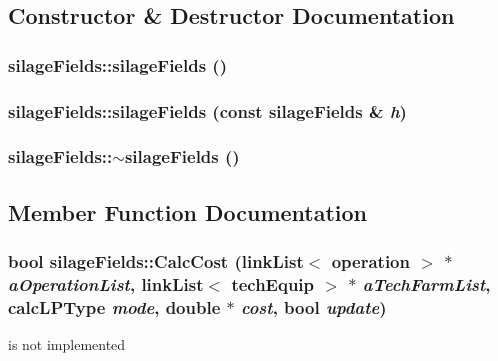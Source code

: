 \subsection{Constructor \& Destructor Documentation}
\hypertarget{classsilage_fields_ab882102171c0ffffc6a96677c726f906}{
\subsubsection[{silageFields}]{\setlength{\rightskip}{0pt plus 5cm}silageFields::silageFields ()}}
\label{classsilage_fields_ab882102171c0ffffc6a96677c726f906}
\hypertarget{classsilage_fields_a20ef91f1391296a1bd9440e13c7b3c94}{
\subsubsection[{silageFields}]{\setlength{\rightskip}{0pt plus 5cm}silageFields::silageFields (const {\bf silageFields} \& {\em h})}}
\label{classsilage_fields_a20ef91f1391296a1bd9440e13c7b3c94}
\hypertarget{classsilage_fields_aa84e406a91dbfd1b553cec61b399085d}{
\subsubsection[{$\sim$silageFields}]{\setlength{\rightskip}{0pt plus 5cm}silageFields::$\sim$silageFields ()}}
\label{classsilage_fields_aa84e406a91dbfd1b553cec61b399085d}


\subsection{Member Function Documentation}
\hypertarget{classsilage_fields_a5ae420a0878bc7f89c3a6fe03f585163}{
\subsubsection[{CalcCost}]{\setlength{\rightskip}{0pt plus 5cm}bool silageFields::CalcCost ({\bf linkList}$<$ {\bf operation} $>$ $\ast$ {\em aOperationList}, \/  {\bf linkList}$<$ {\bf techEquip} $>$ $\ast$ {\em aTechFarmList}, \/  {\bf calcLPType} {\em mode}, \/  double $\ast$ {\em cost}, \/  bool {\em update})}}
\label{classsilage_fields_a5ae420a0878bc7f89c3a6fe03f585163}
is not implemented 

